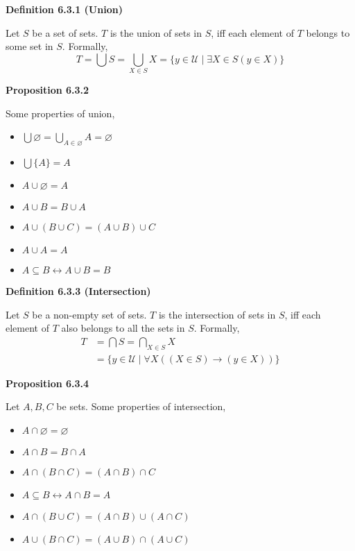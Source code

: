 \documentclass[a4paper]{article}
\newcommand{\subheading}[1]{{\scriptsize\textbf{#1}}}
\begin{document}
\begin{multicols*}{4}
\subheading{Definition 6.3.1 (Union)}

Let $S$ be a set of sets. $T$ is the union of sets in $S$, iff each element of
$T$ belongs to some set in $S$. Formally,
$$T=\bigcup S = \bigcup_{X\in S} X = \{ y \in \mathcal{U}\;|\;\exists X \in S (y
\in X)\}$$

\subheading{Proposition 6.3.2}

Some properties of union,
\begin{itemize}[leftmargin=*] \itemsep -0.3em
  \item $\bigcup \varnothing = \bigcup_{A \in \varnothing} A = \varnothing$
  \item $\bigcup \{A\} = A$
  \item $A \cup \varnothing = A$
  \item $A \cup B = B \cup A$
  \item $A \cup (B \cup C) = (A \cup B) \cup C$
  \item $A \cup A = A$
  \item $A \subseteq B \longleftrightarrow A \cup B = B$
\end{itemize}

\subheading{Definition 6.3.3 (Intersection)}

Let $S$ be a non-empty set of sets. $T$ is the intersection of sets in $S$, iff
each element of $T$ also belongs to all the sets in $S$. Formally,
\begin{align*}
  T &= \bigcap S = \bigcap_{X \in S} X \\
    &= \{y \in \mathcal{U}\;|\; \forall X ((X \in S) \rightarrow (y \in X)) \}
\end{align*}

\subheading{Proposition 6.3.4}

Let $A, B, C$ be sets. Some properties of intersection,

\begin{itemize}[leftmargin=*] \itemsep -0.3em
  \item $A \cap \varnothing = \varnothing$
  \item $A \cap B = B \cap A$
  \item $A \cap (B \cap C) = (A \cap B) \cap C$
  \item $A \subseteq B \longleftrightarrow A \cap B = A$
  \item $A \cap (B \cup C) = (A \cap B) \cup (A \cap C)$
  \item $A \cup (B \cap C) = (A \cup B) \cap (A \cup C)$
\end{itemize}


\end{multicols*}
\end{document}

